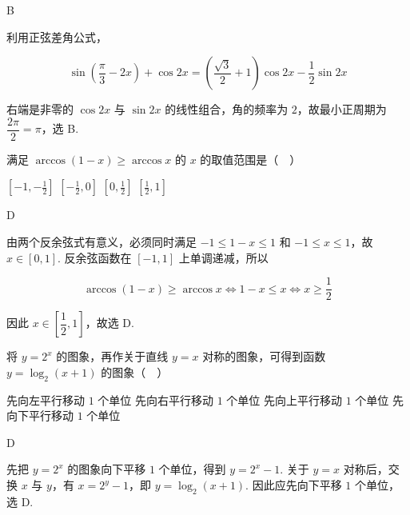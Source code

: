 \begin{answer}
B
\end{answer}

\begin{solution}
利用正弦差角公式，

\[
\sin\left(\frac{\pi}{3}-2x\right)+\cos 2x=\left(\frac{\sqrt{3}}{2}+1\right)\cos 2x-\frac{1}{2}\sin 2x
\]

右端是非零的 \(\cos 2x\) 与 \(\sin 2x\) 的线性组合，角的频率为 \(2\)，故最小正周期为 \(\dfrac{2\pi}{2}=\pi\)，选 B.
\end{solution}

\begin{problem}
满足 \(\arccos(1 - x)\geqslant \arccos x\) 的 \(x\) 的取值范围是（\(\quad\)）

\choices
    {\(\left[-1, -\frac{1}{2}\right]\)}
    {\(\left[-\frac{1}{2},0\right]\)}
    {\(\left[0,\frac{1}{2}\right]\)}
    {\(\left[\frac{1}{2},1\right]\)}
\end{problem}

\begin{answer}
D
\end{answer}

\begin{solution}
由两个反余弦式有意义，必须同时满足 \(-1\leqslant 1-x\leqslant1\) 和 \(-1\leqslant x\leqslant1\)，故 \(x\in[0,1]\). 反余弦函数在 \([-1,1]\) 上单调递减，所以

\[
\arccos(1-x)\geqslant\arccos x\Longleftrightarrow 1-x\leqslant x\Longleftrightarrow x\geqslant\frac12
\]

因此 \(x\in\left[\dfrac12,1\right]\)，故选 D.
\end{solution}

\begin{problem}
将 \(y = 2^x\) 的图象\fillinblank{}，再作关于直线 \(y = x\) 对称的图象，可得到函数 \(y = \log_{2}(x + 1)\) 的图象（\(\quad\)）

\choices
    {先向左平行移动 \(1\) 个单位}
    {先向右平行移动 \(1\) 个单位}
    {先向上平行移动 \(1\) 个单位}
    {先向下平行移动 \(1\) 个单位}
\end{problem}

\begin{answer}
D
\end{answer}

\begin{solution}
先把 \(y=2^{x}\) 的图象向下平移 \(1\) 个单位，得到 \(y=2^{x}-1\). 关于 \(y=x\) 对称后，交换 \(x\) 与 \(y\)，有 \(x=2^{y}-1\)，即 \(y=\log_{2}(x+1)\). 因此应先向下平移 \(1\) 个单位，选 D.
\end{solution}

